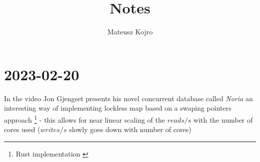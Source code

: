 \documentclass{artikel3}
\title{Notes}
\date{}
\author{Mateusz Kojro}
\begin{document}
\maketitle

\section{2023-02-20}

In the video \cite{noria_yt} \cite{noria_slides} Jon Gjengset presents his novel concurrent database called \textit{Noria}\cite{noria} an interesting way of implementing lockless map based on a swaping pointers approach \footnote{Rust implementation \cite{evmap}} - this allows for near linear scaling of the $reads/s$ with the number of cores used ($writes/s$ slowly goes down with number of cores)


\printbibliography
\end{document}
